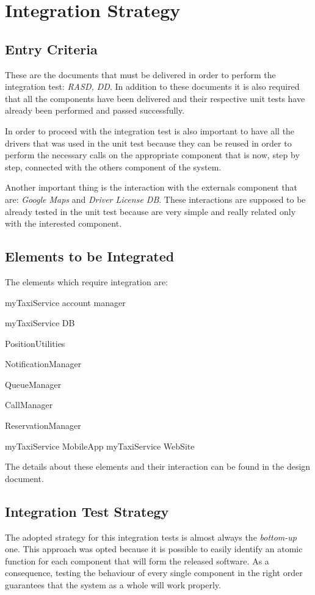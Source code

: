 \documentclass[a4paper]{article}
\begin{document}
\section{Integration Strategy}

\subsection{Entry Criteria}
These are the documents that must be delivered in order to perform the integration test: \textit{RASD, DD}.
In addition to these documents it is also required that all the components have been delivered  and their respective unit tests have already been performed and passed successfully.

In order to proceed with the integration test is also important to have all the drivers that was used in the unit test because they can be reused in order to perform the necessary calls on the appropriate component that is now, step by step, connected with the others component of the system.

Another important thing is the interaction with the externals component that are: \emph{Google Maps} and \emph{Driver License DB}.
These interactions are supposed to be already tested in the unit test because are very simple and really related only with the interested component.

\subsection{Elements to be Integrated}
The elements which require integration are:
\begin{itemize*}
\item myTaxiService account manager
\item myTaxiService DB
\item PositionUtilities
\item NotificationManager
\item QueueManager
\item CallManager
\item ReservationManager
\item myTaxiService MobileApp myTaxiService WebSite
\end{itemize*}
The details about these elements and their interaction can be found in the design document.

\subsection{Integration Test Strategy}
The adopted strategy for this integration tests is almost always the \textit{bottom-up} one. This approach was opted because it is possible to easily identify an atomic function for each component that will form the released software. As a consequence, testing the behaviour of every single component in the right order guarantees that the system as a whole will work properly.
\end{document}
